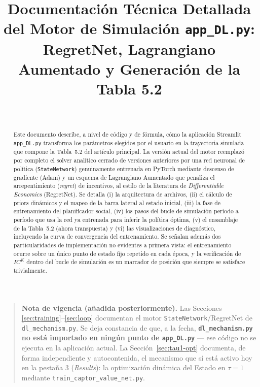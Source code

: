 \documentclass[ecta,nameyear,draft]{econsocart}
\newcommand{\pyfile}[1]{\texttt{#1}}
\newcommand{\pyvar}[1]{\texttt{#1}}
\begin{document}
\begin{frontmatter}

\title{Documentación Técnica Detallada del Motor de Simulación \texttt{app\_DL.py}: RegretNet, Lagrangiano Aumentado y Generación de la Tabla 5.2}

\begin{aug}
\author[add1]{~}
\address[add1]{}
\end{aug}

\begin{abstract}
Este documento describe, a nivel de código y de fórmula, cómo la aplicación
Streamlit \pyfile{app\_DL.py} transforma los parámetros elegidos por el usuario en la
trayectoria simulada que compone la Tabla~5.2 del artículo principal. La versión actual del
motor reemplazó por completo el solver analítico cerrado de versiones anteriores por una red
neuronal de política (\pyvar{StateNetwork}) genuinamente entrenada en PyTorch mediante
descenso de gradiente (Adam) y un esquema de Lagrangiano Aumentado que penaliza el
arrepentimiento (\emph{regret}) de incentivos, al estilo de la literatura de
\emph{Differentiable Economics} (RegretNet). Se detalla (i) la arquitectura de archivos,
(ii) el cálculo de priors dinámicos y el mapeo de la barra lateral al estado inicial,
(iii) la fase de entrenamiento del planificador social, (iv) los pasos del bucle de
simulación período a período que usa la red ya entrenada para inferir la política óptima,
(v) el ensamblaje de la Tabla~5.2 (ahora transpuesta) y (vi) las visualizaciones de
diagnóstico, incluyendo la curva de convergencia del entrenamiento. Se señalan además dos
particularidades de implementación no evidentes a primera vista: el entrenamiento ocurre
sobre un único punto de estado fijo repetido en cada época, y la verificación de $IC^K$
dentro del bucle de simulación es un marcador de posición que siempre se satisface
trivialmente.
\end{abstract}

\begin{keyword}
\end{keyword}

\end{frontmatter}

\begin{quotation}
\noindent\textbf{Nota de vigencia (añadida posteriormente).} Las Secciones
\ref{sec:training}--\ref{sec:loop} documentan el motor \pyvar{StateNetwork}/RegretNet de
\pyfile{dl\_mechanism.py}. Se deja constancia de que, a la fecha, \textbf{\pyfile{dl\_mechanism.py}
no está importado en ningún punto de \pyfile{app\_DL.py}} --- ese código no se ejecuta en la
aplicación actual. La Sección~\ref{sec:tau1-opt} documenta, de forma independiente y
autocontenida, el mecanismo que sí está activo hoy en la pestaña 3 (\emph{Results}): la
optimización dinámica del Estado en $\tau=1$ mediante \pyfile{train\_captor\_value\_net.py}.
\end{quotation}
\end{document}
